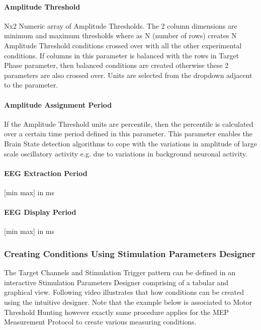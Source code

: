 \documentclass[letterpaper,10pt,english]{sphinxmanual}
\begin{document}
\paragraph{Amplitude Threshold}
\label{\detokenize{14_ERPMeasurement:amplitude-threshold}}
\sphinxAtStartPar
Nx2 Numeric array of Amplitude Thresholds. The 2 column dimensions are minimum and maximum thresholds where as N (number of rows) creates N Amplitude Threshold conditions crossed over with all the other experimental conditions. If columns in this parameter is balanced with the rows in Target Phase parameter, then balanced conditions are created otherwise these 2 parameters are also crossed over. Units are selected from the drop\sphinxhyphen{}down adjacent to the parameter.


\paragraph{Amplitude Assignment Period}
\label{\detokenize{14_ERPMeasurement:amplitude-assignment-period}}
\sphinxAtStartPar
If the Amplitude Threshold units are percentile, then the percentile is calculated over a certain time period defined in this parameter. This parameter enables the Brain State detection algorithms to cope with the variations in amplitude of large scale oscillatory activity e.g. due to variations in background neuronal activity.


\paragraph{EEG Extraction Period}
\label{\detokenize{14_ERPMeasurement:id1}}
\sphinxAtStartPar
{[}min max{]} in ms


\paragraph{EEG Display Period}
\label{\detokenize{14_ERPMeasurement:id2}}
\sphinxAtStartPar
{[}min max{]} in ms


\subsubsection{Creating Conditions Using Stimulation Parameters Designer}
\label{\detokenize{14_ERPMeasurement:creating-conditions-using-stimulation-parameters-designer}}
\sphinxAtStartPar
The Target Channels and Stimulation Trigger pattern can be defined in an interactive Stimulation Parameters Designer comprising of a tabular and graphical view. Following video illustrates that how conditions can be created using the intuitive designer. Note that the example below is associated to Motor Threshold Hunting however exactly same procedure applies for the MEP Measurement Protocol to create various measuring conditions.
\end{document}
